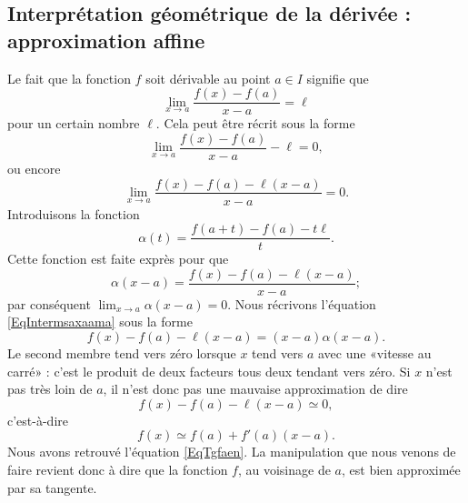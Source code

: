 \subsection[Interprétation géométrique : approximation affine]{Interprétation géométrique de la dérivée : approximation affine}

Le fait que la fonction $f$ soit dérivable au point $a\in I$ signifie que
\begin{equation}
	\lim_{x\to a} \frac{ f(x)-f(a) }{ x-a }=\ell
\end{equation}
pour un certain nombre $\ell$. Cela peut être récrit sous la forme
\begin{equation}
	\lim_{x\to a} \frac{ f(x)-f(a) }{ x-a }-\ell=0,
\end{equation}
ou encore
\begin{equation}
	\lim_{x\to a} \frac{ f(x)-f(a)-\ell(x-a) }{ x-a }=0.
\end{equation}
Introduisons la fonction
\begin{equation}
	\alpha(t)=\frac{ f(a+t)-f(a)-t\ell }{ t }.
\end{equation}
Cette fonction est faite exprès pour que
\begin{equation}		\label{EqIntermsaxaama}
	\alpha(x-a)=\frac{ f(x)-f(a)-\ell(x-a) }{ x-a };
\end{equation}
par conséquent $\lim_{x\to a} \alpha(x-a)=0$. Nous récrivons l'équation \eqref{EqIntermsaxaama} sous la forme
\begin{equation}        \label{EqCodeDerviffxam}
	f(x)-f(a)-\ell(x-a)=(x-a)\alpha(x-a).
\end{equation}
Le second membre tend vers zéro lorsque $x$ tend vers $a$ avec une «vitesse au carré» : c'est le produit de deux facteurs tous deux tendant vers zéro. Si $x$ n'est pas très loin de $a$, il n'est donc pas une mauvaise approximation de dire
\begin{equation}
	f(x)-f(a)-\ell(x-a)\simeq 0,
\end{equation}
c'est-à-dire
\begin{equation}		\label{Eqfxsimesfa}
	f(x)\simeq f(a)+f'(a)(x-a).
\end{equation}
Nous avons retrouvé l'équation \eqref{EqTgfaen}. La manipulation que nous venons de faire revient donc à dire que la fonction $f$, au voisinage de $a$, est bien approximée par sa tangente.


